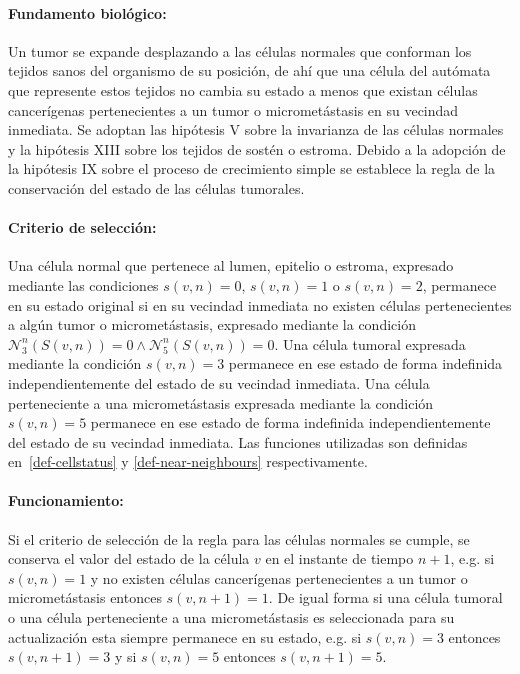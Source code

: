 \paragraph*{{Fundamento biol\'ogico}:} Un tumor se expande desplazando a las c\'elulas normales que conforman los tejidos sanos del organismo de su posici\'on, de ah\'i que una c\'elula del aut\'omata que represente estos tejidos no cambia su estado a menos que existan c\'elulas cancer\'igenas pertenecientes a un tumor o micromet\'astasis en su vecindad inmediata. Se adoptan las hip\'otesis V sobre la invarianza de las c\'elulas normales y la hip\'otesis XIII sobre los tejidos de sost\'en o estroma. Debido a la adopci\'on de la hip\'otesis IX sobre el proceso de crecimiento simple se establece la regla de la conservaci\'on del estado de las c\'elulas tumorales.

\paragraph*{{Criterio de selecci\'on}:} Una c\'elula normal que pertenece al lumen, epitelio o estroma, expresado mediante las condiciones $s(v,n)=0$, $s(v,n)=1$ o $s(v,n)=2$, permanece en su estado original si en su vecindad inmediata no existen c\'elulas pertenecientes a alg\'un tumor o micromet\'astasis, expresado mediante la condici\'on $\mathcal{N}_3^n(S(v,n))=0 \wedge \mathcal{N}_5^n(S(v,n))=0$. Una c\'elula tumoral expresada mediante la condici\'on $s(v,n)=3$ permanece en ese estado de forma indefinida independientemente del estado de su vecindad inmediata. Una c\'elula perteneciente a una micromet\'astasis expresada mediante la condici\'on $s(v,n)=5$ permanece en ese estado de forma indefinida independientemente del estado de su vecindad inmediata. Las funciones utilizadas son definidas en~\ref{def-cellstatus} y \ref{def-near-neighbours} respectivamente.

\paragraph*{{Funcionamiento}:} Si el criterio de selecci\'on de la regla para las c\'elulas normales se cumple, se conserva el valor del estado de la c\'elula $v$ en el instante de tiempo $n+1$, e.g. si $s(v,n)=1$ y no existen c\'elulas cancer\'igenas pertenecientes a un tumor o micromet\'astasis entonces $s(v,n+1)=1$. De igual forma si una c\'elula tumoral o una c\'elula perteneciente a una micromet\'astasis es seleccionada para su actualizaci\'on esta siempre permanece en su estado, e.g. si $s(v,n)=3$ entonces $s(v,n+1)=3$ y si $s(v,n)=5$ entonces $s(v,n+1)=5$.\vspace*{0.5cm}

